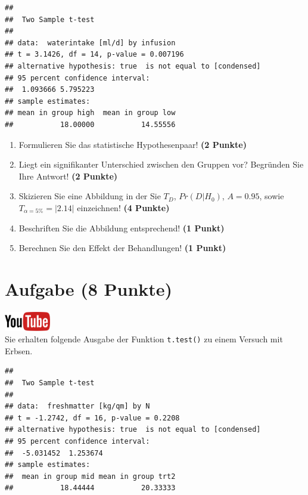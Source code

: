 \documentclass[a4paper, 9pt]{scrartcl}\usepackage[]{graphicx}\usepackage[]{xcolor}
\makeatletter
\newenvironment{kframe}{%
 \def\at@end@of@kframe{}%
 \ifinner\ifhmode%
  \def\at@end@of@kframe{\end{minipage}}%
  \begin{minipage}{\columnwidth}%
 \fi\fi%
 \def\FrameCommand##1{\hskip\@totalleftmargin \hskip-\fboxsep
 \colorbox{shadecolor}{##1}\hskip-\fboxsep
     \hskip-\linewidth \hskip-\@totalleftmargin \hskip\columnwidth}%
 \MakeFramed {\advance\hsize-\width
   \@totalleftmargin\z@ \linewidth\hsize
   \@setminipage}}%
 {\par\unskip\endMakeFramed%
 \at@end@of@kframe}
\newenvironment{knitrout}{}{} %
\makeatother
\begin{document}
\begin{knitrout}
\color{fgcolor}\begin{kframe}
\begin{verbatim}
## 
## 	Two Sample t-test
## 
## data:  waterintake [ml/d] by infusion
## t = 3.1426, df = 14, p-value = 0.007196
## alternative hypothesis: true  is not equal to [condensed]
## 95 percent confidence interval:
##  1.093666 5.795223
## sample estimates:
## mean in group high  mean in group low 
##           18.00000           14.55556
\end{verbatim}
\end{kframe}
\end{knitrout}


\begin{enumerate}
  \item Formulieren Sie das statistische Hypothesenpaar! \textbf{(2
Punkte)}
\item Liegt ein signifikanter Unterschied zwischen den Gruppen vor?
  Begr{\"u}nden Sie Ihre Antwort! \textbf{(2 Punkte)}
\item Skizieren Sie eine Abbildung in der Sie $T_{D}$, $Pr(D|H_0)$, $A=0.95$,
  sowie $T_{\alpha=5\%} = |2.14|$ einzeichnen! \textbf{(4 Punkte)}
\item Beschriften Sie die Abbildung entsprechend! \textbf{(1 Punkt)}  
\item Berechnen Sie den Effekt der Behandlungen! \textbf{(1 Punkt)}
\end{enumerate} 
\clearpage

\section{Aufgabe \hfill (8 Punkte)}

\hfill\href{https://youtu.be/wJqsNV1hOW8}{\includegraphics[width =
  2cm]{img/youtube}}\\[1Ex]



Sie erhalten folgende \Rlogo Ausgabe der Funktion \texttt{t.test()} zu einem Versuch mit Erbsen.

\begin{knitrout}
\color{fgcolor}\begin{kframe}
\begin{verbatim}
## 
## 	Two Sample t-test
## 
## data:  freshmatter [kg/qm] by N
## t = -1.2742, df = 16, p-value = 0.2208
## alternative hypothesis: true  is not equal to [condensed]
## 95 percent confidence interval:
##  -5.031452  1.253674
## sample estimates:
##  mean in group mid mean in group trt2 
##           18.44444           20.33333
\end{verbatim}
\end{kframe}
\end{knitrout}
\end{document}
